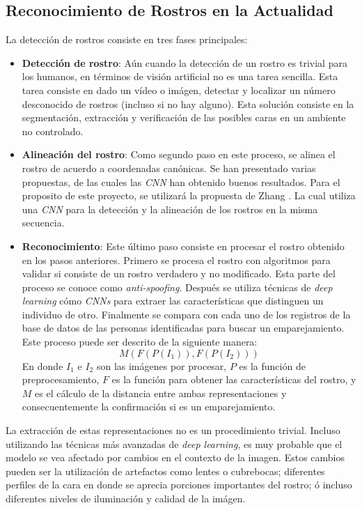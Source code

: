 \documentclass[a4paper, 10pt, conference]{ieeeconf}      %
\begin{document}
    \subsection{Reconocimiento de Rostros en la Actualidad}
    La detección de rostros consiste en tres fases principales:
    \begin{itemize}
        \item \textbf{Detección de rostro}: Aún cuando la detección de un rostro es trivial
            para los humanos, en términos de visión artificial no es una tarea sencilla. Esta
            tarea consiste en dado un vídeo o imágen, detectar y localizar un número
            desconocido de rostros (incluso si no hay alguno). Esta solución consiste en la
            segmentación, extracción y verificación de las posibles caras en un ambiente
            no controlado. \cite{FaceDetection2001}

        \item \textbf{Alineación del rostro}: Como segundo paso en este proceso, se alinea
            el rostro de acuerdo a coordenadas canónicas. \cite{Wang2021} Se han presentado
            varias propuestas, de las cuales las \textit{CNN} han obtenido buenos resultados.
            Para el proposito de este proyecto, se utilizará la propuesta de Zhang \cite{MTCNN}.
            La cual utiliza una \textit{CNN} para la detección y la alineación de los rostros
            en la misma secuencia.

        \item \textbf{Reconocimiento}: Este último paso consiste en procesar el rostro obtenido
            en los pasos anteriores. Primero se procesa el rostro con algoritmos para validar
            si consiste de un rostro verdadero y no modificado. Esta parte del proceso se conoce
            como \textit{anti-spoofing}. Después se utiliza técnicas de \textit{deep learning} cómo
            \textit{CNNs} para extraer las características que distinguen un individuo de otro.
            Finalmente se compara con cada uno de los registros de la base de datos de las
            personas identificadas para buscar un emparejamiento.
            Este proceso puede ser descrito de la siguiente manera: \cite{Wang2021}
                \[ M(F(P(I_1)), F(P(I_2))) \]
            En donde \textit{$I_1$} e \textit{$I_2$} son las imágenes por procesar, \textit{$P$}
            es la función de preprocesamiento, \textit{$F$} es la función para obtener las
            características del rostro, y \textit{$M$} es el cálculo de la distancia entre
            ambas representaciones y consecuentemente la confirmación si es un emparejamiento.
    \end{itemize}
    La extracción de estas representaciones no es un procedimiento trivial. Incluso utilizando
    las técnicas más avanzadas de \textit{deep learning}, es muy probable que el modelo se vea
    afectado por cambios en el contexto de la imagen. Estos cambios pueden ser la utilización
    de artefactos como lentes o cubrebocas; diferentes perfiles de la cara en donde se aprecia
    porciones importantes del rostro; ó incluso diferentes niveles de iluminación y calidad de la
    imágen. \cite{Bodini2019}
\end{document}
